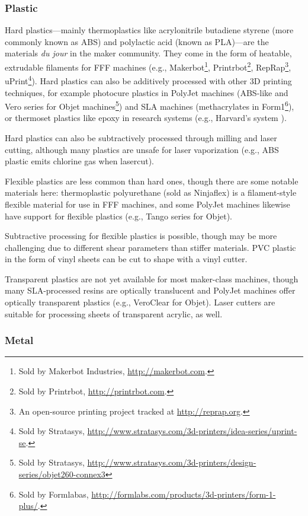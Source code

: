 \subsubsection{Plastic}

Hard plastics---mainly thermoplastics like acrylonitrile butadiene styrene (more commonly known as ABS) and polylactic acid (known as PLA)---are the materials \emph{du jour} in the maker community. They come in the form of heatable, extrudable filaments for FFF machines (e.g., Makerbot\footnote{Sold by Makerbot Industries, \url{http://makerbot.com}.}, Printrbot\footnote{Sold by Printrbot, \url{http://printrbot.com}.}, RepRap\footnote{An open-source printing project tracked at \url{http://reprap.org}.}, uPrint\footnote{Sold by Stratasys, \url{http://www.stratasys.com/3d-printers/idea-series/uprint-se}.}). Hard plastics can also be additively processed with other 3D printing techniques, for example photocure plastics in PolyJet machines (ABS-like and Vero series for Objet machines\footnote{Sold by Stratasys, \url{http://www.stratasys.com/3d-printers/design-series/objet260-connex3}}) and SLA machines (methacrylates in Form1\footnote{Sold by Formlabas, \url{http://formlabs.com/products/3d-printers/form-1-plus/}.}), or thermoset plastics like epoxy in research systems (e.g., Harvard's system \cite{compton-epoxy}).

Hard plastics can also be subtractively processed through milling and laser cutting, although many plastics are unsafe for laser vaporization (e.g., ABS plastic emits chlorine gas when lasercut).

Flexible plastics are less common than hard ones, though there are some notable materials here: thermoplastic polyurethane (sold as Ninjaflex) is a filament-style flexible material for use in FFF machines, and some PolyJet machines likewise have support for flexible plastics (e.g., Tango series for Objet).

Subtractive processing for flexible plastics is possible, though may be more challenging due to different shear parameters than stiffer materials. PVC plastic in the form of vinyl sheets can be cut to shape with a vinyl cutter.

Transparent plastics are not yet available for most maker-class machines, though many SLA-processed resins are optically translucent and PolyJet machines offer optically transparent plastics (e.g., VeroClear for Objet). Laser cutters are suitable for processing sheets of transparent acrylic, as well.

\subsubsection{Metal}


